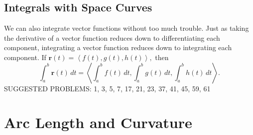 \documentclass[10pt,]{book}
\theoremstyle{ptxplainnotitle}
\theoremstyle{ptxplaintitle}
\theoremstyle{ptxplainnotitle}
\theoremstyle{ptxplaintitle}
\theoremstyle{ptxplainnotitle}
\theoremstyle{ptxplaintitle}
\theoremstyle{ptxdefinitionnotitle}
\theoremstyle{ptxdefinitiontitle}
\theoremstyle{ptxdefinitionnotitle}
\theoremstyle{ptxdefinitiontitle}
\theoremstyle{ptxdefinitionnotitle}
\theoremstyle{ptxdefinitiontitle}
\theoremstyle{ptxdefinitionnotitle}
\theoremstyle{ptxdefinitiontitle}
\theoremstyle{ptxdefinitionnotitle}
\theoremstyle{ptxdefinitiontitle}
\numberwithin{equation}{section}
\newcommand{\vv}[1]{\mathbf{#1}}
\newcommand{\dotprod}[1]{\left\langle #1 \right\rangle}
\begin{document}
\subsection[{Integrals with Space Curves}]{Integrals with Space Curves}\label{subsection-integrals-with-space-curves}
\hypertarget{p-931}{}%
We can also integrate vector functions without too much trouble. Just as taking the derivative of a vector function reduces down to differentiating each component, integrating a vector function reduces down to integrating each component. If \(\vv{r}(t) = \dotprod{f(t),g(t),h(t)},\) then%
%
\begin{equation}
\int_{a}^{b}\vv{r}(t)\,dt = \dotprod{\int_{a}^{b}f(t)\,dt,\int_{a}^{b}g(t)\,dt,\int_{a}^{b}h(t)\,dt}.\label{equation-vector-function-integration}
\end{equation}
\hypertarget{p-932}{}%
SUGGESTED PROBLEMS: 1, 3, 5, 7, 17, 21, 23, 37, 41, 45, 59, 61%
\typeout{************************************************}
\typeout{************************************************}
\section[{Arc Length and Curvature}]{Arc Length and Curvature}\label{section-arc-length-and-curvature}
\typeout{************************************************}
\typeout{************************************************}
\end{document}
